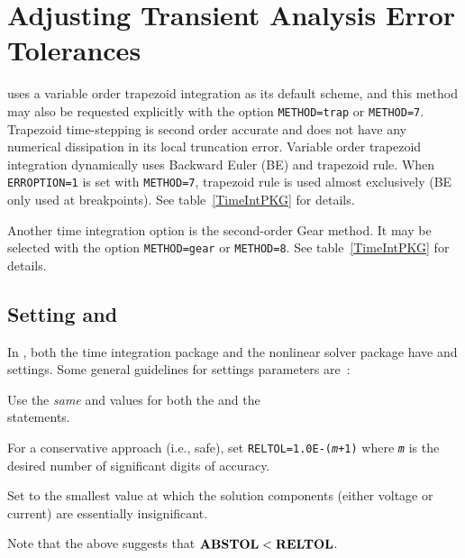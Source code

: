 \section{Adjusting Transient Analysis Error Tolerances}

\Xyce{} uses a variable order trapezoid integration as its default
scheme, and this method may also be requested explicitly with the
 option \texttt{METHOD=trap} or
\texttt{METHOD=7}. Trapezoid time-stepping is second order accurate
and does not have any numerical dissipation in its local truncation
error. Variable order trapezoid integration dynamically uses Backward
Euler (BE) and trapezoid rule. When \texttt{ERROPTION=1} is set with
\texttt{METHOD=7}, trapezoid rule is used almost exclusively (BE
only used at breakpoints). See table~\ref{TimeIntPKG} for details.

Another time integration option is the second-order Gear method.  It
may be selected with the  option \texttt{METHOD=gear} or
\texttt{METHOD=8}. See table~\ref{TimeIntPKG} for details.

\subsection{Setting  and }
In \Xyce{}, both the time integration package and the nonlinear solver package
have  and  settings.  Some general guidelines for
settings parameters are~\cite{Petzold:1996}:
\begin{XyceItemize}
\item Use the \emph{same}  and  values for both
  the  and the \\  
  statements.
\item For a conservative approach (i.e., safe), set \texttt{RELTOL=1.0E-(\emph{m}+1)}
  where \texttt{\emph{m}} is the desired number of significant digits of
  accuracy.
\item Set  to the smallest value at which the solution
  components (either voltage or current) are essentially insignificant.
\item Note that the above suggests that $\textrm{\textbf{ABSTOL}}<\textrm{\textbf{RELTOL}}$.
\end{XyceItemize}

